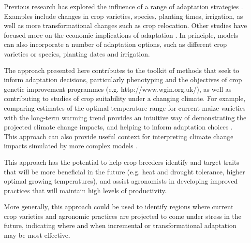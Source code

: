 \documentclass[12pt]{iopart}
\newcommand{\remove}[1]{}
\newcommand{\add}[1]{#1}
\begin{document}
Previous research has explored the influence of a range of adaptation strategies \citep[e.g.][and references therein]{challinor:2014}. Examples include changes in crop varieties, species, planting times, irrigation, as well as more transformational changes such as crop relocation. Other studies have focused more on the economic implications of adaptation \citep{Seo:2008, schlenker:2013, Carter:2018, Dalhaus:2018}. In principle, models can also incorporate a number of adaptation options, such as different crop varieties or species, planting dates and irrigation. 

\remove{Taking this approach  means the model can add to the}\add{The approach presented here contributes to the} toolkit of methods that seek to inform adaptation decisions, particularly \add{phenotyping and} the objectives of crop genetic improvement programmes (e.g. http://www.wgin.org.uk/), as well as contributing to studies of crop suitability under a changing climate. For example, comparing estimates of the optimal temperature range for current maize varieties with the long-term warming trend provides an intuitive way of demonstrating the projected climate change impacts, and helping to inform adaptation choices \citep[e.g.][]{tigchelaar:2018}. This approach can also provide useful context for interpreting climate change impacts simulated by more complex models \citep[e.g.][]{ostberg:2018}.

This approach has the potential to help crop breeders identify and target traits that will be more beneficial in the future (e.g. heat and drought tolerance, higher optimal growing temperatures), and assist agronomists in developing improved practices that will maintain high levels of productivity. 

More generally, this approach could be used to identify regions where current crop varieties and agronomic practices are projected to come under stress in the future, indicating where and when incremental or transformational adaptation may be most effective.
\end{document}
